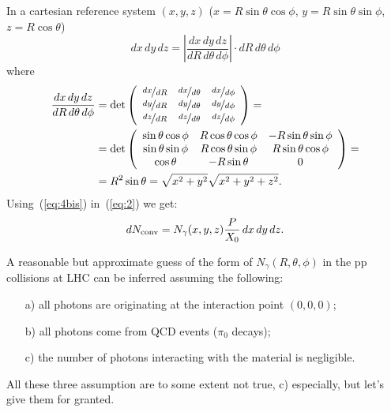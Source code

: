 In a cartesian reference system $(x, y, z)$ ($x=R\sin\theta\cos\phi$, $y=R\sin\theta\sin\phi$, $z=R\cos\theta$)
\begin{equation}
 dx\,dy\,dz  = \left| \frac{dx\, dy\, dz}{dR\,d\theta\,d\phi}
   \right| \cdot dR\,d\theta\,d\phi
\label{eq:3tris}
\end{equation}
where
\begin{equation}
\begin{split}
\frac{dx\,dy\,dz}{dR\,d\theta\,d\phi}
& = \det \left( \begin{array}{ccc}
\nicefrac{dx}{dR}      & \nicefrac{dx}{d\theta}      & \nicefrac{dx}{d\phi} \\
\nicefrac{dy}{dR}      & \nicefrac{dy}{d\theta}      & \nicefrac{dy}{d\phi} \\
\nicefrac{dz}{dR}      & \nicefrac{dz}{d\theta}   & \nicefrac{dz}{d\phi}
\end{array} \right)
= \\
& = \det \left( \begin{array}{ccc}
\sin\theta\cos\phi & R\cos\theta\cos\phi & -R\sin\theta\sin\phi\\
\sin\theta\sin\phi & R\cos\theta\sin\phi &  R\sin\theta\cos\phi\\
\cos\theta & -R\sin\theta & 0 
\end{array} \right)
= \\
& = R^2 \sin \theta = \sqrt{x^2+y^2}\sqrt{x^2+y^2+z^2}.
\end{split}
\label{eq:4tris}
\end{equation}
Using~(\ref{eq:4bis}) in~(\ref{eq:2}) we get:
\begin{equation}
dN_{\rm conv} = N_{\gamma}(x, y, z) 
\frac{P}{X_0}
 \,dx\,dy\,dz .
\label{eq:5tris}
\end{equation}

A reasonable but approximate guess of the form of
$N_{\gamma}(R, \theta, \phi)$ in the pp collisions at LHC can be
inferred assuming the following:
\begin{itemize}
\item[a)] all photons are originating at the interaction point $(0, 0, 0)$;
\item[b)] all photons come from QCD events ($\pi_0$ decays);
\item[c)] the number of photons interacting with the material is negligible. 
\end{itemize}
All these three assumption are to some extent not true, c) especially,
but let's give them for granted.

